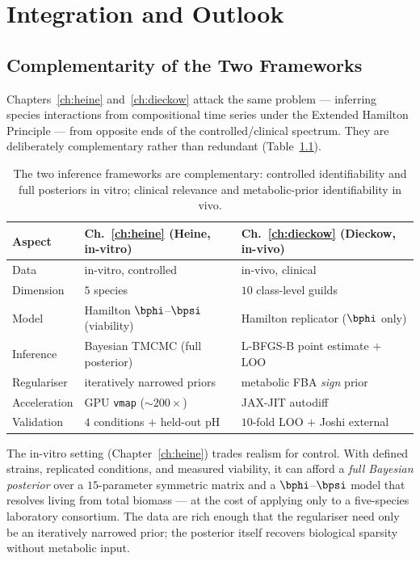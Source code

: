 \chapter{Integration and Outlook}
\label{ch:integration}

\section{Complementarity of the Two Frameworks}
\label{sec:integration_compare}

Chapters~\ref{ch:heine} and~\ref{ch:dieckow} attack the same problem --- inferring
species interactions from compositional time series under the Extended Hamilton
Principle --- from opposite ends of the controlled/clinical spectrum. They are
deliberately complementary rather than redundant (Table~\ref{tab:complementarity}).

\begin{table}[htbp]
  \centering\small
  \begin{tabular}{@{}lll@{}}
    \toprule
    \textbf{Aspect} & \textbf{Ch.~\ref{ch:heine} (Heine, in-vitro)} & \textbf{Ch.~\ref{ch:dieckow} (Dieckow, in-vivo)}\\
    \midrule
    Data           & in-vitro, controlled & in-vivo, clinical\\
    Dimension      & $5$ species          & $10$ class-level guilds\\
    Model          & Hamilton $\bphi$--$\bpsi$ (viability) & Hamilton replicator ($\bphi$ only)\\
    Inference      & Bayesian TMCMC (full posterior) & L-BFGS-B point estimate $+$ LOO\\
    Regulariser    & iteratively narrowed priors & metabolic FBA \emph{sign} prior\\
    Acceleration   & GPU \texttt{vmap} ($\sim$$200\times$) & JAX-JIT autodiff\\
    Validation     & $4$ conditions $+$ held-out pH & $10$-fold LOO $+$ Joshi external\\
    \bottomrule
  \end{tabular}
  \caption[Complementarity of the in-vitro and in-vivo frameworks]{The two
  inference frameworks are complementary: controlled identifiability and full
  posteriors in vitro; clinical relevance and metabolic-prior identifiability in
  vivo.}
  \label{tab:complementarity}
\end{table}

The in-vitro setting (Chapter~\ref{ch:heine}) trades realism for control. With
defined strains, replicated conditions, and measured viability, it can afford a
\emph{full Bayesian posterior} over a $15$-parameter symmetric matrix and a
$\bphi$--$\bpsi$ model that resolves living from total biomass --- at the cost of
applying only to a five-species laboratory consortium. The data are rich enough
that the regulariser need only be an iteratively narrowed prior; the posterior
itself recovers biological sparsity without metabolic input.


